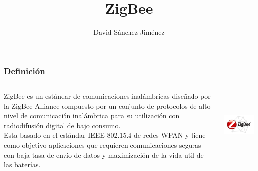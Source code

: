 \documentclass[10pt,a4paper,spanish]{beamer}
\title{ZigBee}
\author{David Sánchez Jiménez}
\begin{document}
\frame{\titlepage}

\begin{frame}
	\frametitle{Definición}
	\begin{columns}
		\begin{column}{6cm}
			ZigBee es un estándar de comunicaciones inalámbricas diseñado por la ZigBee Alliance compuesto por un conjunto de protocolos de alto nivel de comunicación inalámbrica para su utilización con radiodifusión digital de bajo consumo. \\

			\vspace{0.5cm}
			Esta basado en el estándar IEEE 802.15.4 de redes WPAN y tiene como objetivo aplicaciones que requieren comunicaciones seguras con baja tasa de envío de datos y maximización de la vida util de las baterías.
		\end{column}
		\begin{column}{5cm}
			\begin{center}
				\includegraphics[height=3.5cm]{imagenes/1.png}
			\end{center}
		\end{column}
	\end{columns}
\end{frame}
\end{document}

